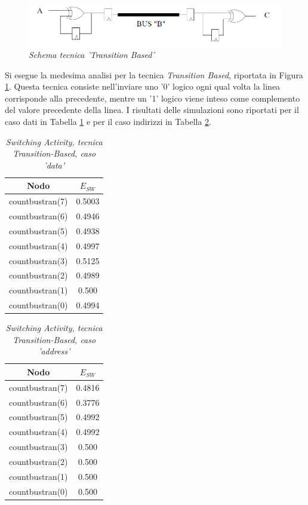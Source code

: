 \begin{figure}[!htb]
	\centering
	\includegraphics[scale=1.2]{immagini/transition}
	\caption{\textit{Schema tecnica 'Transition Based'}}
	\label{transition}
\end{figure}
\noindent Si esegue la medesima analisi per la tecnica \textit{Transition Based}, riportata in Figura \ref{transition}. Questa tecnica consiste nell'inviare uno '0' logico ogni qual volta la linea corrisponde alla precedente, mentre un '1' logico viene inteso come complemento del valore precedente della linea. I risultati delle simulazioni sono riportati per il caso dati in Tabella \ref{Tab5} e per il caso indirizzi in Tabella \ref{Tab6}. \\
\begin{table}[!h]\footnotesize
	\centering
	\begin{tabular}{|c|c|}
		\hline
		\textbf{Nodo} & \textbf{$E_{SW}$}\\
		\hline
		countbustran(7) & 0.5003\\
		countbustran(6) & 0.4946\\
		countbustran(5) & 0.4938\\
		countbustran(4) & 0.4997\\
		countbustran(3) & 0.5125\\
		countbustran(2) & 0.4989\\
		countbustran(1) & 0.500\\
		countbustran(0) & 0.4994\\
		\hline
	\end{tabular}
	\caption{\textit{Switching Activity, tecnica Transition-Based, caso 'data'}}
	\label{Tab5}
\end{table}
\begin{table}[!h]\footnotesize
	\centering
	\begin{tabular}{|c|c|}
		\hline
		\textbf{Nodo} & \textbf{$E_{SW}$}\\
		\hline
		countbustran(7) & 0.4816\\
		countbustran(6) & 0.3776\\
		countbustran(5) & 0.4992\\
		countbustran(4) & 0.4992\\
		countbustran(3) & 0.500\\
		countbustran(2) & 0.500\\
		countbustran(1) & 0.500\\
		countbustran(0) & 0.500\\
		\hline
	\end{tabular}
	\caption{\textit{Switching Activity, tecnica Transition-Based, caso 'address'}}
	\label{Tab6}
\end{table}
